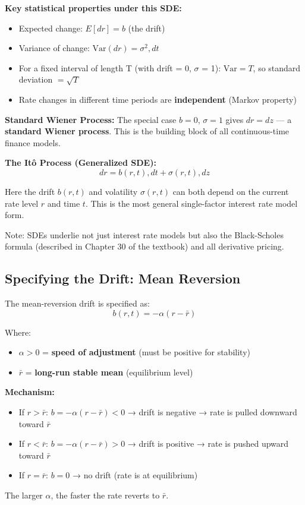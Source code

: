 \documentclass[12pt,openany]{book}
\theoremstyle{definition}
\theoremstyle{remark}
\begin{document}
\textbf{Key statistical properties under this SDE:}

\begin{itemize}
\item Expected change: $E[dr] = b$ (the drift)


\item Variance of change: $\text{Var}(dr) = \sigma^2 , dt$


\item For a fixed interval of length T (with drift = 0, \(\sigma\) = 1): $\text{Var} = T$, so standard deviation $= \sqrt{T}$


\item Rate changes in different time periods are \textbf{independent} (Markov property)


\end{itemize}
\textbf{Standard Wiener Process:} The special case $b = 0$, $\sigma = 1$ gives $dr = dz$ --- a \textbf{standard Wiener process}. This is the building block of all continuous-time finance models.

\textbf{The Itô Process (Generalized SDE):} \[
dr = b(r,t) , dt + \sigma(r,t) , dz
\]

Here the drift $b(r,t)$ and volatility $\sigma(r,t)$ can both depend on the current rate level $r$ and time $t$. This is the most general single-factor interest rate model form.

Note: SDEs underlie not just interest rate models but also the Black-Scholes formula (described in Chapter 30 of the textbook) and all derivative pricing.

\medskip
\subsection{Specifying the Drift: Mean Reversion}
The mean-reversion drift is specified as: \[
b(r,t) = -\alpha(r - \bar{r})
\]

Where:

\begin{itemize}
\item $\alpha > 0$ = \textbf{speed of adjustment} (must be positive for stability)


\item $\bar{r}$ = \textbf{long-run stable mean} (equilibrium level)


\end{itemize}
\textbf{Mechanism:}

\begin{itemize}
\item If $r > \bar{r}$: $b = -\alpha(r - \bar{r}) < 0$ → drift is negative → rate is pulled downward toward $\bar{r}$


\item If $r < \bar{r}$: $b = -\alpha(r - \bar{r}) > 0$ → drift is positive → rate is pushed upward toward $\bar{r}$


\item If $r = \bar{r}$: $b = 0$ → no drift (rate is at equilibrium)


\end{itemize}
The larger $\alpha$, the faster the rate reverts to $\bar{r}$.
\end{document}

